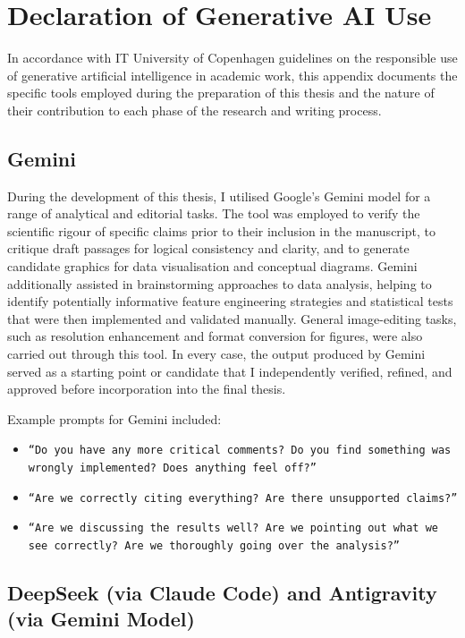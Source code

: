 \clearpage
\section{Declaration of Generative AI Use}
\label{sec:ai_declaration}

In accordance with IT University of Copenhagen guidelines on the responsible use of generative artificial intelligence in academic work, this appendix documents the specific tools employed during the preparation of this thesis and the nature of their contribution to each phase of the research and writing process.

\subsection{Gemini}

During the development of this thesis, I utilised Google's Gemini model for a range of analytical and editorial tasks. The tool was employed to verify the scientific rigour of specific claims prior to their inclusion in the manuscript, to critique draft passages for logical consistency and clarity, and to generate candidate graphics for data visualisation and conceptual diagrams. Gemini additionally assisted in brainstorming approaches to data analysis, helping to identify potentially informative feature engineering strategies and statistical tests that were then implemented and validated manually. General image-editing tasks, such as resolution enhancement and format conversion for figures, were also carried out through this tool. In every case, the output produced by Gemini served as a starting point or candidate that I independently verified, refined, and approved before incorporation into the final thesis.

Example prompts for Gemini included:
\begin{itemize}
    \item \texttt{``Do you have any more critical comments? Do you find something was wrongly implemented? Does anything feel off?''}
    \item \texttt{``Are we correctly citing everything? Are there unsupported claims?''}
    \item \texttt{``Are we discussing the results well? Are we pointing out what we see correctly? Are we thoroughly going over the analysis?''}
\end{itemize}

\subsection{DeepSeek (via Claude Code) and Antigravity (via Gemini Model)}

